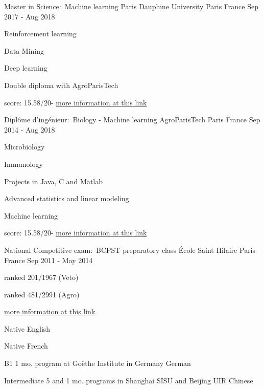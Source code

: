 \documentclass[11pt, a4paper]{awesome-cv}
\begin{document}
\begin{cventries}
\cventry
{Master in Science:~Machine learning}
{Paris Dauphine University}
{Paris France}
{Sep 2017 - Aug 2018}
{
\begin{cvitems}
\item{Reinforcement learning}
\item{Data Mining}
\item{Deep learning}
\item{Double diploma with AgroParisTech}
\item{score: 15.58/20\quad - \quad\href{https://dauphine.psl.eu/formations/masters/informatique/m2-intelligence-artificielle-systemes-donnees}{more information at this link}}
\end{cvitems}
}


\cventry
{Diplôme d'ingénieur:~Biology - Machine learning}
{AgroParisTech}
{Paris France}
{Sep 2014 - Aug 2018}
{
\begin{cvitems}
\item{Microbiology}
\item{Immunology}
\item{Projects in Java, C and Matlab}
\item{Advanced statistics and linear modeling}
\item{Machine learning}
\item{score: 15.58/20\quad - \quad\href{http://www.agroparistech.fr/ufr-info/iodaa/}{more information at this link}}
\end{cvitems}
}


\cventry
{National Competitive exam:~BCPST preparatory class}
{École Saint Hilaire}
{Paris France}
{Sep 2011 - May 2014}
{
\begin{cvitems}
\item{ranked 201/1967 (Veto)}
\item{ranked 481/2991 (Agro)}
\item{\href{https://en.wikipedia.org/wiki/Classe_preparatoire_aux_grandes_ecoles}{more information at this link}}
\end{cvitems}
}
\end{cventries}
\begin{cvhonors}
\cvhonor
{Native}
{}
{}
{English}

\cvhonor
{Native}
{}
{}
{French}

\cvhonor
{B1}
{1 mo. program at Goëthe Institute in Germany}
{}
{German}

\cvhonor
{Intermediate}
{5 and 1 mo. programs in Shanghai SISU and Beijing UIR}
{}
{Chinese}
\end{cvhonors}
\end{document}
